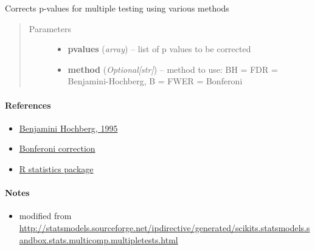 \documentclass[letterpaper,10pt,english]{sphinxmanual}
\begin{document}
\begin{fulllineitems}
\label{api/ClearMap.Analysis.Tools:ClearMap.Analysis.Tools.MultipleComparisonCorrection.correctPValues}
Corrects p-values for multiple testing using various methods
\begin{quote}\begin{description}
\item[{Parameters}] \leavevmode\begin{itemize}
\item {} 
\textbf{pvalues} (\emph{array}) --
list of p values to be corrected

\item {} 
\textbf{method} (\emph{Optional{[}str{]}}) --
method to use: BH = FDR = Benjamini-Hochberg, B = FWER = Bonferoni

\end{itemize}

\end{description}\end{quote}
\paragraph{References}
\begin{itemize}
\item {} 
\href{http://www.jstor.org/stable/2346101?seq=1\#page\_scan\_tab\_contents}{Benjamini Hochberg, 1995}

\item {} 
\href{http://www.tandfonline.com/doi/abs/10.1080/01621459.1961.10482090\#.VmHWUHbH6KE}{Bonferoni correction}

\item {} 
\href{https://www.r-project.org/}{R statistics package}

\end{itemize}
\paragraph{Notes}
\begin{itemize}
\item {} 
modified from \href{http://statsmodels.sourceforge.net/ipdirective/generated/scikits.statsmodels.sandbox.stats.multicomp.multipletests.html}{http://statsmodels.sourceforge.net/ipdirective/generated/scikits.statsmodels.sandbox.stats.multicomp.multipletests.html}

\end{itemize}

\end{fulllineitems}
\end{document}
